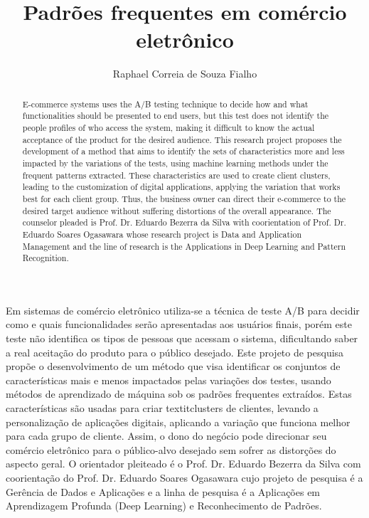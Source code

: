 \documentclass[12pt]{article}
\title{Padrões frequentes em comércio eletrônico}
\author{Raphael Correia de Souza Fialho\inst{1}}
\begin{document}
 

\maketitle

\begin{abstract}
   E-commerce systems uses the A/B testing technique to decide how and what functionalities should be presented to end users, but this test does not identify the people profiles of who access the system, making it difficult to know the actual acceptance of the product for the desired audience. This research project proposes the development of a method that aims to identify the sets of characteristics more and less impacted by the variations of the tests, using machine learning methods under the frequent patterns extracted. These characteristics are used to create client clusters, leading to the customization of digital applications, applying the variation that works best for each client group. Thus, the business owner can direct their e-commerce to the desired target audience without suffering distortions of the overall appearance. The counselor pleaded is Prof. Dr. Eduardo Bezerra da Silva with coorientation of Prof. Dr. Eduardo Soares Ogasawara whose research project is Data and Application Management and the line of research is the Applications in Deep Learning and Pattern Recognition.
\end{abstract}
     
\begin{resumo} 
  Em sistemas de comércio eletrônico utiliza-se a técnica de teste A/B para decidir como e quais funcionalidades serão apresentadas aos usuários finais, porém este teste não identifica os tipos de pessoas que acessam o sistema, dificultando saber a real aceitação do produto para o público desejado.
  Este projeto de pesquisa propõe o desenvolvimento de um método que visa identificar os conjuntos de características mais e menos impactados pelas variações dos testes, usando métodos de aprendizado de máquina sob os padrões frequentes extraídos.
  Estas características são usadas para criar textit{clusters} de clientes, levando a personalização de aplicações digitais, aplicando a variação que funciona melhor para cada grupo de cliente. Assim, o dono do negócio pode direcionar seu comércio eletrônico para o público-alvo desejado sem sofrer as distorções do aspecto geral. O orientador pleiteado é o Prof. Dr. Eduardo Bezerra da Silva com coorientação do Prof. Dr. Eduardo Soares Ogasawara cujo projeto de pesquisa é a Gerência de Dados e Aplicações e a linha de pesquisa é a Aplicações em Aprendizagem Profunda (Deep Learning) e Reconhecimento de Padrões.
\end{resumo}
\end{document}

